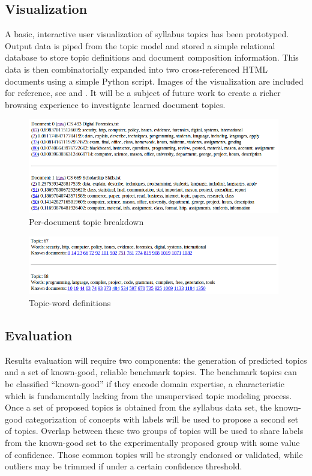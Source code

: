 \subsection{Visualization}

A basic, interactive user visualization of syllabus topics has been
prototyped. Output data is piped from the topic model and stored a simple
relational database to store topic definitions and document composition
information. This data is then combinatorially expanded into two
cross-referenced HTML documents using a simple Python script. Images of the
visualization are included for reference, see  and
. It will be a subject of future work to create a
richer browsing experience to investigate learned document topics.

\begin{figure}[ht]
\centering
\includegraphics[width=0.98\textwidth]{figures/vis-docs.png}
\caption{Per-document topic breakdown\label{fig:vis-docs}}
\end{figure}

\begin{figure}[ht]
\centering
\includegraphics[width=0.98\textwidth]{figures/vis-topics.png}
\caption{Topic-word definitions\label{fig:vis-topics}}
\end{figure}


\subsection{Evaluation}

Results evaluation will require two components: the generation of predicted
topics and a set of known-good, reliable benchmark topics. The benchmark
topics can be classified ``known-good'' if they encode domain expertise, a
characteristic which is fundamentally lacking from the unsupervised topic
modeling process. Once a set of proposed topics is obtained from the
syllabus data set, the known-good categorization of concepts with labels
will be used to propose a second set of topics.  Overlap between these two
groups of topics will be used to share labels from the known-good set to
the experimentally proposed group with some value of confidence. Those
common topics will be strongly endorsed or validated, while outliers may be
trimmed if under a certain confidence threshold.

